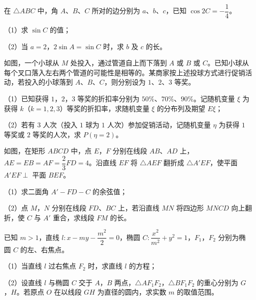 \begin{question}
在 $\triangle ABC$ 中，角 $A$、$B$、$C$ 所对的边分别为 $a$、$b$、$c$，已知 $\cos2C=-\dfrac14$。

（1）求 $\sin C$ 的值；

（2）当 $a=2$，$2\sin A=\sin C$ 时，求 $b$ 及 $c$ 的长。

\Needspace{0.4\textheight}
\end{question}
\begingroup
\renewenvironment{question}{\Needspace{0.5\textheight}}{}
\begin{question}
如图，一个小球从 $M$ 处投入，通过管道自上而下落到 $A$ 或 $B$ 或 $C$。已知小球从每个叉口落入左右两个管道的可能性是相等的。某商家按上述投球方式进行促销活动，若投入的小球落到 $A$、$B$、$C$，则分别设为 $1$、$2$、$3$ 等奖。

（1）已知获得 $1$，$2$，$3$ 等奖的折扣率分别为 $50\%$、$70\%$、$90\%$。记随机变量 $\xi$ 为获得 $k$（$k=1,2,3$）等奖的折扣率，求随机变量 $\xi$ 的分布列及期望 $E\xi$；

（2）若有 $3$ 人次（投入 $1$ 球为 $1$ 人次）参加促销活动，记随机变量 $\eta$ 为获得 $1$ 等奖或 $2$ 等奖的人次，求 $P(\eta=2)$。
\nopagebreak[4]
\begin{center}\end{center}
\nopagebreak[4]
\Needspace{0.4\textheight}
\end{question}
\endgroup
\begingroup
\renewenvironment{question}{\Needspace{0.5\textheight}}{}
\begin{question}
如图，在矩形 $ABCD$ 中，点 $E$，$F$ 分别在线段 $AB$、$AD$ 上，$AE=EB=AF=\dfrac23FD=4$。沿直线 $EF$ 将 $\triangle AEF$ 翻折成 $\triangle A'EF$，使平面 $A'EF\perp$ 平面 $BEF$。

（1）求二面角 $A'-FD-C$ 的余弦值；

（2）点 $M$，$N$ 分别在线段 $FD$、$BC$ 上，若沿直线 $MN$ 将四边形 $MNCD$ 向上翻折，使 $C$ 与 $A'$ 重合，求线段 $FM$ 的长。
\nopagebreak[4]
\begin{center}\end{center}
\nopagebreak[4]
\Needspace{0.4\textheight}
\end{question}
\endgroup
\begingroup
\renewenvironment{question}{\Needspace{0.5\textheight}}{}
\begin{question}
已知 $m>1$，直线 $l:x-my-\dfrac{m^2}{2}=0$，椭圆 $C:\dfrac{x^2}{m^2}+y^2=1$，$F_1$，$F_2$ 分别为椭圆 $C$ 的左、右焦点。

（1）当直线 $l$ 过右焦点 $F_2$ 时，求直线 $l$ 的方程；

（2）设直线 $l$ 与椭圆 $C$ 交于 $A$，$B$ 两点，$\triangle AF_1F_2$，$\triangle BF_1F_2$ 的重心分别为 $G$，$H$。若原点 $O$ 在以线段 $GH$ 为直径的圆内，求实数 $m$ 的取值范围。
\nopagebreak[4]
\begin{center}\end{center}
\nopagebreak[4]
\end{question}
